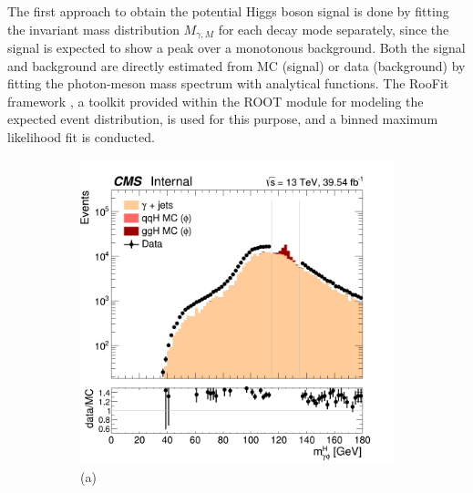 The first approach to obtain the potential Higgs boson signal is done by fitting the invariant mass distribution $M_{\gamma, M}$ for each decay mode separately, since the signal is expected to show a peak over a monotonous background. Both the signal and background are directly estimated from MC (signal) or data (background) by fitting the photon-meson mass spectrum with analytical functions. The RooFit framework \cite{CERN:root_roofit}, a toolkit provided within the ROOT module for modeling the expected event distribution, is used for this purpose, and a binned maximum likelihood fit is conducted.
\begin{figure}[!ht]
    \captionsetup[subfigure]{labelformat=empty}
    \vspace*{-0.2cm}
    \centering
    \setlength{\mylength}{\textwidth}
    \begin{subfigure}[t]{0.50\mylength}
        \centering
        \includegraphics[width=0.45\mylength]{resources/plots/Phi3_HiggsMass.png}
        \caption{\footnotesize (a)}
    \end{subfigure}%
    \begin{subfigure}[t]{0.50\mylength}
        \centering

\end{subfigure}
\end{figure}

